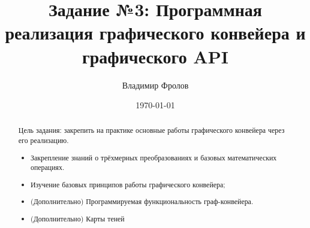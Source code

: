 \documentclass[12pt,subf,href,colorlinks=true]{article}
\title{Задание №3: Программная реализация графического конвейера и графического API}
\author{Владимир Фролов}
\date{\today}
\begin{document}
\maketitle

\begin{abstract}
	
\noindent Цель задания: закрепить на практике основные работы графического конвейера через его реализацию.

\begin{itemize}

\item Закрепление знаний о трёхмерных преобразованиях и базовых математических операциях.
\item Изучение базовых принципов работы графического конвейера;
\item (Дополнительно) Программируемая функциональность граф-конвейера.
\item (Дополнительно) Карты теней	 
	 
\end{itemize}	

\end{abstract}
\end{document}
